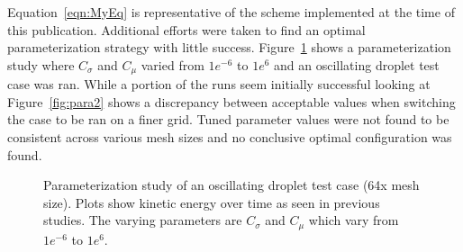   Equation~\ref{eqn:MyEq} is representative of the scheme implemented at the time of this publication.  Additional efforts were taken to  find an optimal parameterization strategy with little success. Figure~\ref{fig:para} shows a parameterization study where $C_{\sigma}$ and $C_{\mu}$ varied from $1e^{-6}$ to $1e^6$ and an oscillating droplet test case was ran. While a portion of the runs seem initially successful looking at Figure~\ref{fig:para2} shows a discrepancy between acceptable values when switching the case to be ran on a finer grid. Tuned parameter values were not found to be consistent across various mesh sizes and no conclusive optimal configuration was found. 
\begin{figure}[htbp]
	\centering
	\caption{Parameterization study of an oscillating droplet test case (64x mesh size). Plots show kinetic energy over time as seen in previous studies. The varying parameters are $C_{\sigma}$ and $C_{\mu}$ which vary from $1e^{-6}$ to $1e^6$.}
	\label{fig:para}
\end{figure}
